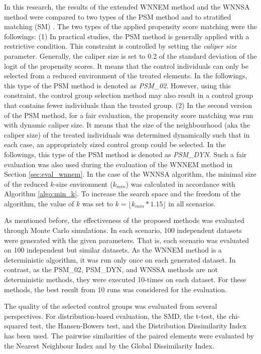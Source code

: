 		In this research, the results of the extended WNNEM method and the WNNSA method were compared to two types of the PSM method and to stratified matching (SM) \cite{arnab2017survey, hankin2019sampling}. The two types of the applied propensity score matching were the followings: (1) In practical studies, the PSM method is generally applied with a restrictive condition. This constraint is controlled by setting the \textit{caliper size} parameter. Generally, the caliper size is set to 0.2 of the standard deviation of the logit of the propensity scores. It means that the control individuals can only be selected from a reduced environment of the treated elements. In the followings, this type of the PSM method is denoted as \textit{PSM\_02}. However, using this constraint, the control group selection method may also result in a control group that contains fewer individuals than the treated group. (2) In the second version of the PSM method, for a fair evaluation, the propensity score matching was run with dynamic caliper size. It means that the size of the neighbourhood (aka the caliper size) of the treated individuals was determined dynamically such that in each case, an appropriately sized control group could be selected. In the followings, this type of the PSM method is denoted as \textit{PSM\_DYN}. Such a fair evaluation was also used during the evaluation of the WNNEM method in Section \ref{sec:eval_wnnem}. In the case of the WNNSA algorithm, the minimal size of the reduced $k$-size environment ($k_{min}$) was calculated in accordance with Algorithm \ref{algo:min_k}. To increase the search space and the freedom of the algorithm, the value of $k$ was set to $k=\lfloor k_{min}*1.15 \rfloor$ in all scenarios.
								
		As mentioned before, the effectiveness of the proposed methods was evaluated through Monte Carlo simulations. In each scenario, 100 independent datasets were generated with the given parameters. That is, each scenario was evaluated on 100 independent but similar datasets. As the WNNEM method is a deterministic algorithm, it was run only once on each generated dataset. In contrast, as the PSM\_02, PSM\_DYN, and WNSSA methods are not deterministic methods, they were executed 10-times on each dataset. For these methods, the best result from 10 runs was considered for the evaluation. 
								
		The quality of the selected control groups was evaluated from several perspectives. For distribution-based evaluation, the SMD, the t-test, the chi-squared test, the Hansen-Bowers test, and the Distribution Dissimilarity Index has been used. The pairwise similarities of the paired elements were evaluated by the Nearest Neighbour Index and by the Global Dissimilarity Index. 
		       
